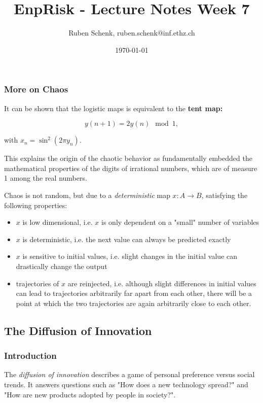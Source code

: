 \documentclass[a4paper]{extarticle}
\title{EnpRisk - Lecture Notes Week 7}
\author{Ruben Schenk, ruben.schenk@inf.ethz.ch}
\date{\today}
\begin{document}
\maketitle

\subsubsection{More on Chaos}

It can be shown that the logistic maps is equivalent to the \textbf{tent map:}

\[
    y(n + 1) = 2y(n) \mod 1,
\]

with $x_n = \sin^2(2 \pi y_n)$.

This explains the origin of the chaotic behavior as fundamentally embedded the mathematical properties of the digits of irrational numbers, which are of measure 1 among the real numbers.

Chaos is not random, but due to a \textit{deterministic} map $x : A \to B$, satisfying the following properties:

\begin{itemize}
    \item $x$ is low dimensional, i.e. $x$ is only dependent on a "small" number of variables
    \item $x$ is deterministic, i.e. the next value can always be predicted exactly
    \item $x$ is sensitive to initial values, i.e. slight changes in the initial value can drastically change the output
    \item trajectories of $x$ are reinjected, i.e. although slight differences in initial values can lead to trajectories arbitrarily far apart from each other, there will be a point at which the two trajectories are again arbitrarily close to each other.
\end{itemize}

\subsection{The Diffusion of Innovation}

\subsubsection{Introduction}

The \textit{diffusion of innovation} describes a game of personal preference versus social trends. It answers questions such as "How does a new technology spread?" and "How are new products adopted by people in society?".
\end{document}
